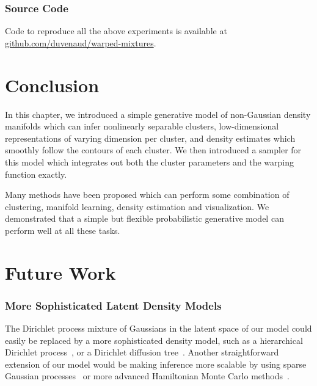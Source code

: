 \subsubsection{Source Code}
Code to reproduce all the above experiments is available at \url{github.com/duvenaud/warped-mixtures}.


\section{Conclusion}

In this chapter, we introduced a simple generative model of non-Gaussian density manifolds which can infer nonlinearly separable clusters, low-dimensional representations of varying dimension per cluster, and density estimates which smoothly follow the contours of each cluster.
We then introduced a sampler for this model which integrates out both the cluster parameters and the warping function exactly.

Many methods have been proposed which can perform some combination of clustering, manifold learning, density estimation and visualization.
We demonstrated that a simple but flexible probabilistic generative model can perform well at all these tasks.



\section{Future Work}


\subsubsection{More Sophisticated Latent Density Models}
The Dirichlet process mixture of Gaussians in the latent space of our model could easily be replaced by a more sophisticated density model, such as a hierarchical Dirichlet process~\citep{teh2006hierarchical}, or a Dirichlet diffusion tree~\citep{neal2003density}.
Another straightforward extension of our model would be making inference more scalable by using sparse Gaussian processes~\citep{quinonero2005unifying,snelson2006sparse} or more advanced Hamiltonian Monte Carlo methods~\citep{zhang2011quasi}.

